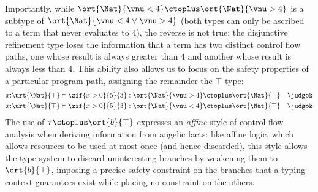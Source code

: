 Importantly, while
$\ort{\Nat}{\vnu < 4} \ctoplus \ort{\Nat}{\vnu > 4}$ is a subtype of
$\ort{\Nat}{\vnu < 4 \lor \vnu > 4}$ (both types can only be ascribed
to a term that never evaluates to $4$), the reverse is not true: the
disjunctive refinement type loses the information that a term has two
distinct control flow paths, one whose result is always greater than
$4$ and another whose result is always less than $4$.  This ability also allows us to
focus on the safety properties of a particular program path, assigning
the remainder the $\top$ type:
\begin{align*}
  &x{:}\urt{\Nat}{\top} \vdash \zif{x > 0}{5}{3} : \ort{\Nat}{\vnu > 4} \ctoplus \ort{\Nat}{\top} \quad \judgok
  \\&x{:}\urt{\Nat}{\top} \vdash \zif{x > 0}{5}{3} : \ort{\Nat}{\vnu < 4} \ctoplus \ort{\Nat}{\top} \quad \judgok
\end{align*}\noindent
The use of $\tau \ctoplus \ort{b}{\top}$ expresses an \emph{affine}
style of control flow analysis when deriving information from angelic
facts: like affine logic, which allows resources to be used at most
once (and hence discarded), this style allows the type system to
discard uninteresting branches by weakening them to $\ort{b}{\top}$,
imposing a precise safety constraint on the branches that a typing
context guarantees exist while placing no constraint on the others.


